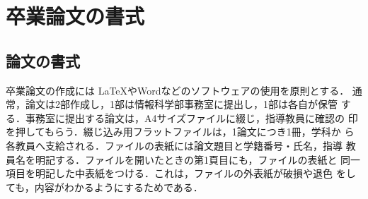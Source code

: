 \thispagestyle{myheadings}
\chapter{卒業論文の書式}
\label{sec:format}

\section{論文の書式}
\label{sec:format_thesis}

卒業論文の作成には \LaTeX やWordなどのソフトウェアの使用を原則とする．
通常，論文は2部作成し，1部は情報科学部事務室に提出し，1部は各自が保管
する．事務室に提出する論文は，A4サイズファイルに綴じ，指導教員に確認の
印を押してもらう．綴じ込み用フラットファイルは，1論文につき1冊，学科か
ら各教員へ支給される．ファイルの表紙には論文題目と学籍番号・氏名，指導
教員名を明記する．ファイルを開いたときの第1頁目にも，ファイルの表紙と
同一項目を明記した中表紙をつける．これは，ファイルの外表紙が破損や退色
をしても，内容がわかるようにするためである．

